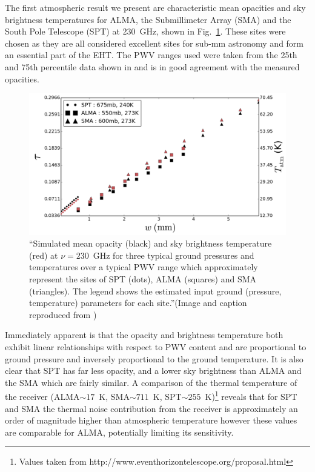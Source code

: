 The first atmospheric result we present are characteristic mean opacities and sky brightness temperatures for ALMA, the Submillimeter Array (SMA) and the South Pole Telescope (SPT) at 230~GHz, shown in Fig.~\ref{fig:mean_atm}. These sites were chosen as they are all considered excellent sites for sub-mm astronomy and form an essential part of the EHT. The PWV ranges used were taken from the 25th and 75th percentile data shown in \citet{Lane_1998} and is in good agreement with the measured opacities. 


\begin{figure}[h!]
\includegraphics[width=1.\columnwidth]{Images/opacity}
\caption{``Simulated mean opacity (black) and sky brightness temperature (red) at $\nu =230$~GHz  for three typical ground pressures and temperatures over a typical PWV range \citep{Lane_1998} which approximately represent the sites of SPT (dots), ALMA (squares) and SMA (triangles). The legend shows the estimated input ground (pressure, temperature) parameters for each site.''(Image and caption reproduced from \citet{Blecher_2016})\label{fig:mean_atm}%
}
\end{figure}


Immediately apparent is that the opacity and brightness temperature both exhibit linear relationships with respect to PWV content and are proportional to ground pressure and inversely proportional to the ground temperature. It is also clear that SPT has far less opacity, and a lower sky brightness than ALMA and the SMA which are fairly similar. A comparison of the thermal temperature of the receiver (ALMA$\sim17$~K,  SMA$\sim711$~K, SPT$\sim 255$~K)\footnote{Values taken from http://www.eventhorizontelescope.org/proposal.html} reveals that for SPT and SMA the thermal noise contribution from the receiver is approximately an order of magnitude higher than atmospheric temperature however these values are comparable for ALMA, potentially limiting its sensitivity. 


